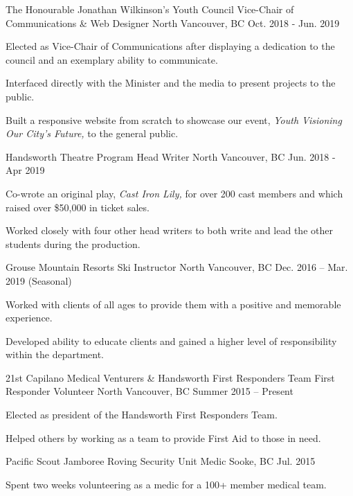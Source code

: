 \documentclass[]{awesome-cv}
\begin{document}
  \cventry
  {The Honourable Jonathan Wilkinson's Youth Council}
  {Vice-Chair of Communications \& Web Designer}
  {North Vancouver, BC}
  {Oct. 2018 - Jun. 2019}
  {\begin{cvitems}
      \item {Elected as Vice-Chair of Communications after displaying a dedication to the council and an exemplary ability to communicate.}
      \item {Interfaced directly with the Minister and the media to present projects to the public.}
      \item {Built a responsive website from scratch to showcase our event, \textit{Youth Visioning Our City's Future,} to the general public.}
  \end{cvitems}}
  \cventry
  {Handsworth Theatre Program}
  {Head Writer}
  {North Vancouver, BC}
  {Jun. 2018 - Apr 2019}
  {\begin{cvitems}
      \item {Co-wrote an original play, \textit{Cast Iron Lily,} for over 200 cast members and which raised over \$50,000 in ticket sales.}
      \item {Worked closely with four other head writers to both write and lead the other students during the production.}
    \end{cvitems}}
\begin{cventries}
  \cventry
  {Grouse Mountain Resorts}
  {Ski Instructor}
  {North Vancouver, BC}
  {Dec. 2016 – Mar. 2019 (Seasonal)}
  {\begin{cvitems}
    \item {Worked with clients of all ages to provide them with a positive and memorable  experience.}
    \item {Developed ability to educate clients and gained a higher level of responsibility within the department.}
    \end{cvitems}}
  \cventry
  {21st Capilano Medical Venturers \& Handsworth First Responders Team}
  {First Responder Volunteer}
  {North Vancouver, BC}
  {Summer 2015 – Present}
  {\begin{cvitems}
      \item {Elected as president of the Handsworth First Responders Team.}
    \item {Helped others by working as a team to provide First Aid to those in need.}
    \end{cvitems}}
  \cventry
  {Pacific Scout Jamboree}
  {Roving Security Unit Medic}
  {Sooke, BC}
  {Jul. 2015}
  {\begin{cvitems}
      \item {Spent two weeks volunteering as a medic for a 100+ member medical team.}
  \end{cvitems}}
\end{cventries}
\end{document}
